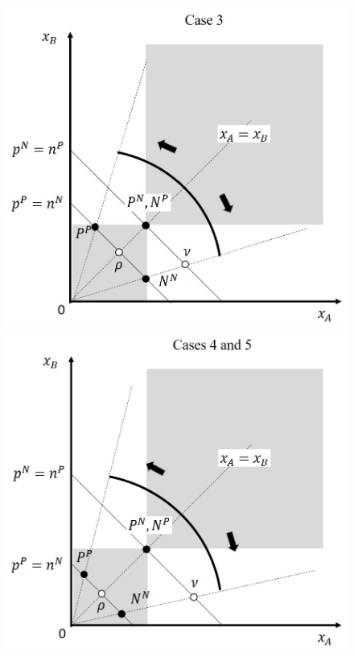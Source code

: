 \documentclass[smallcondensed]{svjour3}
\begin{document}
\begin{figure}[ht!]
   \includegraphics[scale=0.4]{figures/main_design_case_3.jpg}\includegraphics[scale=0.4]{figures/main_design_case_4.jpg}
   \begin{minipage}{12cm}
   \footnotesize

\end{minipage}
\end{figure}
\end{document}

